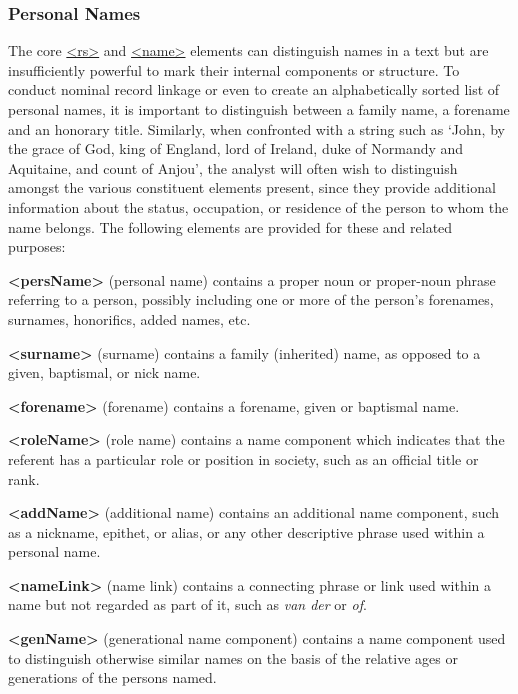 \subsubsection[{Personal Names}]{Personal Names}\label{NDPER}\par
The core \hyperref[TEI.rs]{<rs>} and \hyperref[TEI.name]{<name>} elements can distinguish names in a text but are insufficiently powerful to mark their internal components or structure. To conduct nominal record linkage or even to create an alphabetically sorted list of personal names, it is important to distinguish between a family name, a forename and an honorary title. Similarly, when confronted with a string such as ‘John, by the grace of God, king of England, lord of Ireland, duke of Normandy and Aquitaine, and count of Anjou’, the analyst will often wish to distinguish amongst the various constituent elements present, since they provide additional information about the status, occupation, or residence of the person to whom the name belongs. The following elements are provided for these and related purposes: 
\begin{sansreflist}
  
\item [\textbf{<persName>}] (personal name) contains a proper noun or proper-noun phrase referring to a person, possibly including one or more of the person's forenames, surnames, honorifics, added names, etc.
\item [\textbf{<surname>}] (surname) contains a family (inherited) name, as opposed to a given, baptismal, or nick name.
\item [\textbf{<forename>}] (forename) contains a forename, given or baptismal name.
\item [\textbf{<roleName>}] (role name) contains a name component which indicates that the referent has a particular role or position in society, such as an official title or rank.
\item [\textbf{<addName>}] (additional name) contains an additional name component, such as a nickname, epithet, or alias, or any other descriptive phrase used within a personal name.
\item [\textbf{<nameLink>}] (name link) contains a connecting phrase or link used within a name but not regarded as part of it, such as \textit{van der} or \textit{of}.
\item [\textbf{<genName>}] (generational name component) contains a name component used to distinguish otherwise similar names on the basis of the relative ages or generations of the persons named.
\end{sansreflist}
